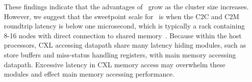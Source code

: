 {%


These findings indicate that the advantages of \name~grow as the cluster size increases. However, we suggest that the sweetpoint scale for \name~is when the C2C and C2M roundtrip latency is below one microsecond, which is typically a rack containing 8-16 nodes with direct connection to shared memory~\cite{pond}. Because within the host processors, CXL accessing datapath share many latency hiding modules, such as store buffers and miss-status handling registers, with main memory accessing datapath. Excessive latency in CXL memory access may overwhelm these modules and effect main memory accessing performance.
}


